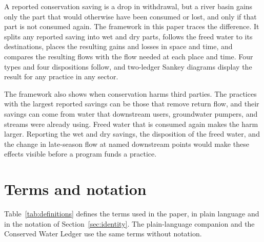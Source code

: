 \documentclass[11pt]{article}
\begin{document}
A reported conservation saving is a drop in withdrawal, but a river basin gains only the part that would otherwise have been consumed or lost, and only if that part is not consumed again. The framework in this paper traces the difference. It splits any reported saving into wet and dry parts, follows the freed water to its destinations, places the resulting gains and losses in space and time, and compares the resulting flows with the flow needed at each place and time. Four types and four dispositions follow, and two-ledger Sankey diagrams display the result for any practice in any sector.

The framework also shows when conservation harms third parties. The practices with the largest reported savings can be those that remove return flow, and their savings can come from water that downstream users, groundwater pumpers, and streams were already using. Freed water that is consumed again makes the harm larger. Reporting the wet and dry savings, the disposition of the freed water, and the change in late-season flow at named downstream points would make these effects visible before a program funds a practice.

\appendix
\section{Terms and notation}\label{app:definitions}

Table~\ref{tab:definitions} defines the terms used in the paper, in plain language and in the notation of Section~\ref{sec:identity}. The plain-language companion and the Conserved Water Ledger \citep{yoder2026ledger} use the same terms without notation.
\end{document}
